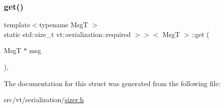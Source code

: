 \subsubsection{\texorpdfstring{get()}{get()}}
{\footnotesize\ttfamily template$<$typename MsgT $>$ \\
static std\+::size\+\_\+t vt\+::serialization\+::required $>$$>$$<$ MsgT $>$\+::get (\begin{DoxyParamCaption}\item[{MsgT $\ast$}]{msg }\end{DoxyParamCaption})\hspace{0.3cm}{\ttfamily [inline]}, {\ttfamily [static]}}



The documentation for this struct was generated from the following file\+:\begin{DoxyCompactItemize}
\item 
src/vt/serialization/\hyperlink{src_2vt_2serialization_2sizer_8h}{sizer.\+h}\end{DoxyCompactItemize}
